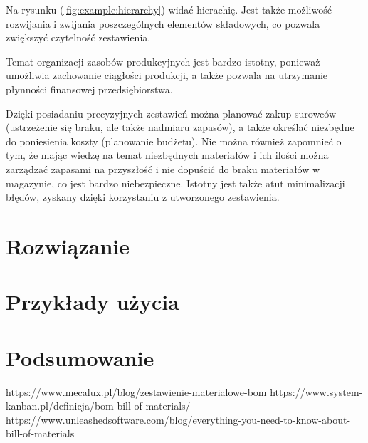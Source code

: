 \documentclass[12pt,twoside]{article}
\begin{document}
Na rysunku (\ref{fig:example:hierarchy}) widać hierachię. Jest także możliwość rozwijania i zwijania poszczególnych elementów składowych, co pozwala zwiększyć czytelność zestawienia.

Temat organizacji zasobów produkcyjnych jest bardzo istotny, ponieważ umożliwia zachowanie ciągłości produkcji, a także pozwala na utrzymanie płynności finansowej przedsiębiorstwa.

Dzięki posiadaniu precyzyjnych zestawień można planować zakup surowców (ustrzeżenie się braku, ale także nadmiaru zapasów), a także określać niezbędne do poniesienia koszty (planowanie budżetu). Nie można również zapomnieć o tym, że mając wiedzę na temat niezbędnych materiałów i ich ilości można zarządzać zapasami na przyszłość i nie dopuścić do braku materiałów w magazynie, co jest bardzo niebezpieczne. Istotny jest także atut minimalizacji błędów, zyskany dzięki korzystaniu z utworzonego zestawienia.

\clearpage
\section{Rozwiązanie}

\clearpage
\section{Przykłady użycia}

\clearpage
\section{Podsumowanie}

\clearpage

\begin{thebibliography}{8}
\label{sec:bibliography}
https://www.mecalux.pl/blog/zestawienie-materialowe-bom
https://www.system-kanban.pl/definicja/bom-bill-of-materials/
https://www.unleashedsoftware.com/blog/everything-you-need-to-know-about-bill-of-materials
\end{thebibliography}
\clearpage
\end{document}
